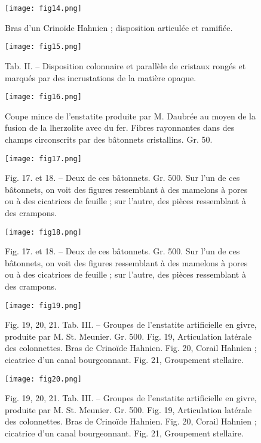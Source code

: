 \documentclass[a4paper, 12pt, oneside, french]{book}
\begin{document}
\begin{figure}[b]
\texttt{[image: fig14.png]}
\caption{Bras d'un Crinoïde Hahnien ; disposition articulée et ramifiée.}
\centering
\end{figure}
\begin{figure}[b]
\texttt{[image: fig15.png]}
\caption{Tab. II. – Disposition colonnaire et parallèle de cristaux rongés et marqués par des incrustations de la matière opaque.}
\centering
\end{figure}
\clearpage
{}
\begin{figure}[b]
\texttt{[image: fig16.png]}
\caption{Coupe mince de l'enstatite produite par M. Daubrée au moyen de la fusion de la lherzolite avec du fer. Fibres rayonnantes dans des champs circonscrits par des bâtonnets cristallins. Gr. 50.}
\centering
\end{figure}
\begin{figure}[b]
\texttt{[image: fig17.png]}
\caption{Fig. 17. et 18. – Deux de ces bâtonnets. Gr. 500. Sur l'un de ces bâtonnets, on voit des figures ressemblant à des mamelons à pores ou à des cicatrices de feuille ; sur l'autre, des pièces ressemblant à des crampons.}
\centering
\end{figure}
\begin{figure}[b]
\texttt{[image: fig18.png]}
\caption{Fig. 17. et 18. – Deux de ces bâtonnets. Gr. 500. Sur l'un de ces bâtonnets, on voit des figures ressemblant à des mamelons à pores ou à des cicatrices de feuille ; sur l'autre, des pièces ressemblant à des crampons.}
\centering
\end{figure}
\begin{figure}[b]
\texttt{[image: fig19.png]}
\caption{Fig. 19, 20, 21. Tab. III. – Groupes de l'enstatite artificielle en givre, produite par M. St. Meunier. Gr. 500. Fig. 19, Articulation latérale des colonnettes. Bras de Crinoïde Hahnien. Fig. 20, Corail Hahnien ; cicatrice d'un canal bourgeonnant. Fig. 21, Groupement stellaire.}
\centering
\end{figure}
\begin{figure}[b]
\texttt{[image: fig20.png]}
\caption{Fig. 19, 20, 21. Tab. III. – Groupes de l'enstatite artificielle en givre, produite par M. St. Meunier. Gr. 500. Fig. 19, Articulation latérale des colonnettes. Bras de Crinoïde Hahnien. Fig. 20, Corail Hahnien ; cicatrice d'un canal bourgeonnant. Fig. 21, Groupement stellaire.}
\centering
\end{figure}
\end{document}
